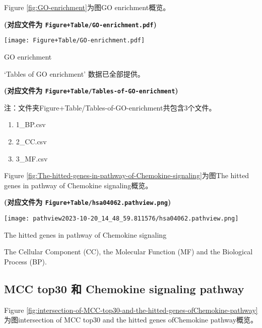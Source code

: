 \documentclass[
]{article}
\providecommand{\tightlist}{%
  \setlength{\itemsep}{0pt}\setlength{\parskip}{0pt}}
\begin{document}
Figure \ref{fig:GO-enrichment}为图GO enrichment概览。

\textbf{(对应文件为 \texttt{Figure+Table/GO-enrichment.pdf})}

\def\@captype{figure}
\begin{center}
\texttt{[image: Figure+Table/GO-enrichment.pdf]}
\caption{GO enrichment}\label{fig:GO-enrichment}
\end{center}

`Tables of GO enrichment' 数据已全部提供。

\textbf{(对应文件为 \texttt{Figure+Table/Tables-of-GO-enrichment})}

\begin{center}\begin{tcolorbox}[colback=gray!10, colframe=gray!50, width=0.9\linewidth, arc=1mm, boxrule=0.5pt]注：文件夹Figure+Table/Tables-of-GO-enrichment共包含3个文件。

\begin{enumerate}\tightlist
\item 1\_BP.csv
\item 2\_CC.csv
\item 3\_MF.csv
\end{enumerate}\end{tcolorbox}
\end{center}

Figure \ref{fig:The-hitted-genes-in-pathway-of-Chemokine-signaling}为图The hitted genes in pathway of Chemokine signaling概览。

\textbf{(对应文件为 \texttt{Figure+Table/hsa04062.pathview.png})}

\def\@captype{figure}
\begin{center}
\texttt{[image: pathview2023-10-20\_14\_48\_59.811576/hsa04062.pathview.png]}
\caption{The hitted genes in pathway of Chemokine signaling}\label{fig:The-hitted-genes-in-pathway-of-Chemokine-signaling}
\end{center}

The Cellular Component (CC), the Molecular Function (MF) and the Biological Process (BP).

\hypertarget{mcc2chemo}{%
\subsection{MCC top30 和 Chemokine signaling pathway}\label{mcc2chemo}}

Figure \ref{fig:intersection-of-MCC-top30-and-the-hitted-genes-ofChemokine-pathway}为图intersection of MCC top30 and the hitted genes ofChemokine pathway概览。
\end{document}
